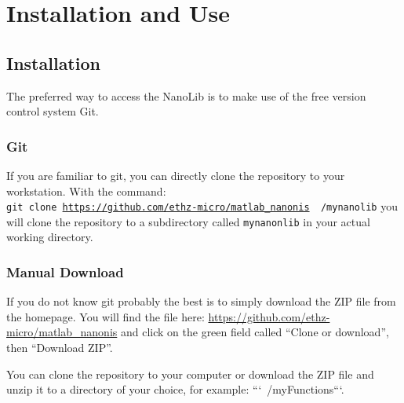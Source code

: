 \section{Installation and Use}

\subsection{Installation}

The preferred way to access the NanoLib is to make use of the free version control system Git.

\subsubsection{Git} \label{git-install}
If you are familiar to git, you can directly clone the repository to your workstation. With the command: \\
\texttt{git clone \url{https://github.com/ethz-micro/matlab_nanonis} ~/mynanolib} you will clone the repository to a subdirectory called \texttt{mynanonlib} in your actual working directory.
\subsubsection{Manual Download} \label{man-install}
If you do not know git probably the best is to simply download the ZIP file from the homepage. You will find the file here: \url{https://github.com/ethz-micro/matlab_nanonis} and click on the green field called ``Clone or download'', then ``Download ZIP''.

You can clone the repository to your computer or download the ZIP file and unzip it to a directory of your choice, for example: ```~/myFunctions```.

%
%
%
%
%
%
